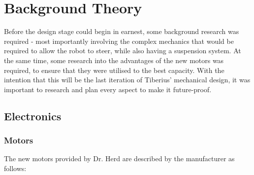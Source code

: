 \section{Background Theory}
Before the design stage could begin in earnest, some background research was required - most importantly involving the complex mechanics that would be required to allow the robot to steer, while also having a suspension system.
\newline
At the same time, some research into the advantages of the new motors was required, to ensure that they were utilised to the best capacity. With the intention that this will be the last iteration of Tiberius' mechanical design, it was important to research and plan every aspect to make it future-proof.

\subsection{Electronics}
\subsubsection{Motors}
\label{sec:Mech_BGT_Motor}
The new motors provided by Dr. Herd are described by the manufacturer as follows:

